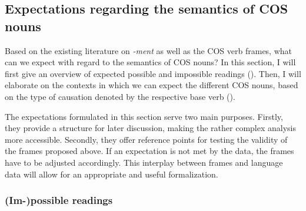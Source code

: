 \subsection{Expectations regarding the semantics of COS nouns}
\label{sec:cos-output-predictions}

Based on the existing literature on \textit{-ment} as well as the COS verb frames, what can we expect with regard to the semantics of COS nouns?
In this section, I will first give an overview of expected possible and impossible readings (). 
Then, I will elaborate on the contexts in which we can expect the different COS nouns, based on the type of causation denoted by the respective base verb ().

The expectations formulated in this section serve two main purposes.
Firstly, they provide a structure for later discussion, making the rather complex analysis more accessible.  
Secondly, they offer reference points for testing the validity of the frames proposed above. If an expectation is not met by the data, the frames have to be adjusted accordingly. This interplay between frames and language data will allow for an appropriate and useful formalization.     

\subsubsection{{(Im-)possible readings}}
\label{sec:cos-output-predictions-read}


